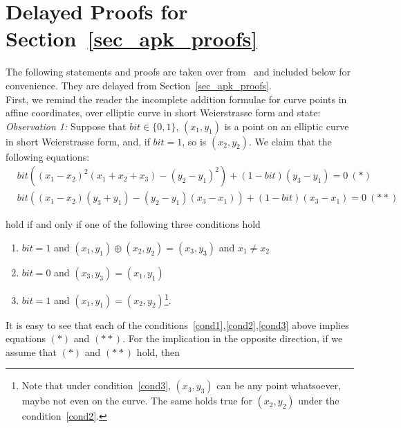 \section{Delayed Proofs for Section~\ref{sec_apk_proofs}}
\label{sec:delayed}

The following statements and proofs are taken over from~\cite{LC_paper} and included below for convenience. They are delayed from Section~\ref{sec_apk_proofs}. \\


\noindent First, we remind the reader the incomplete addition formulae for curve points in affine coordinates, over elliptic curve in short Weierstrasse form and state:\\ 

\noindent \textit{Observation 1:} \label{obs} Suppose that $\mathit{bit} \in \{0,1\}$, $(x_1,y_1)$ is a point on an elliptic curve in 
short Weierstrasse form, and, if $\mathit{bit} = 1$, so is $(x_2,y_2)$. We claim that the following equations: 
\begin{align*}
&\mathit{bit}((x_1 - x_2)^2 (x_1 + x_2 + x_3) - (y_2 - y_1)^2 ) + (1 - \mathit{bit})(y_3 - y_1)  =0 \ (\ast)\\
&\mathit{bit}((x_1 - x_2)(y_3 + y_1) - (y_2 - y_1)(x_3 - x_1)) + (1 - \mathit{bit})(x_3 - x_1)  =0 \ (\ast\ast)
\end{align*}

\noindent hold if and only if one of the following three conditions hold 

\begin{enumerate}
\item \label{cond1} $\mathit{bit}=1$ and $(x_1,y_1)\oplus(x_2,y_2)=(x_3,y_3)$ and $x_1 \neq x_2$
\item \label{cond2} $\mathit{bit}=0$ and $(x_3,y_3)=(x_1,y_1)$ 
\item  \label{cond3} $\mathit{bit}=1$ and $(x_1,y_1)=(x_2,y_2)$\footnote{Note that under condition~\ref{cond3}, $(x_3,y_3)$ 
can be any point whatsoever, maybe not even on the curve. The same holds true for $(x_2, y_2)$ under the condition~\ref{cond2}.}.
\end{enumerate}

\noindent It is easy to see that each of the conditions~\ref{cond1},\ref{cond2},\ref{cond3} above implies equations $(\ast)$ and $(\ast \ast)$.
\noindent For the implication in the opposite direction, if we assume that $(\ast)$ and $(\ast \ast)$ hold, then \\
\vspace{-0.1in}

